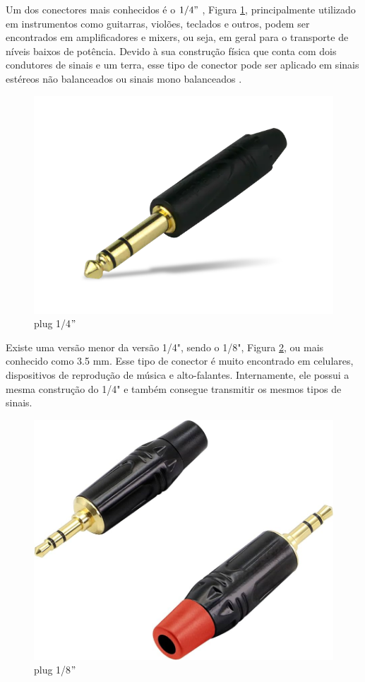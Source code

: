 Um dos conectores mais conhecidos é o $1/4"$ , Figura \ref{fig19}, principalmente utilizado em instrumentos como guitarras, violões, teclados e outros, podem ser encontrados em amplificadores e mixers, ou seja, em geral para o transporte de níveis baixos de potência. Devido à sua construção física que conta com dois condutores de sinais e um terra, esse tipo de conector pode ser aplicado em sinais estéreos não balanceados ou sinais mono balanceados \cite{bartlett}.

\begin{figure}[h]
	\centering
    \includegraphics[scale=0.2]{figuras/fig19.png}
	\caption{plug 1/4$"$}
	\label{fig19}
\end{figure}

Existe uma versão menor da versão 1/4", sendo o 1/8", Figura \ref{fig20}, ou mais conhecido como 3.5 mm. Esse tipo de conector é muito encontrado em celulares, dispositivos de reprodução de música e alto-falantes. Internamente, ele possui a mesma construção do 1/4" e também consegue transmitir os mesmos tipos de sinais.

\begin{figure}[h]
	\centering
    \includegraphics[scale=0.2]{figuras/fig20.png}
	\caption{plug 1/8$"$}
	\label{fig20}
\end{figure}

